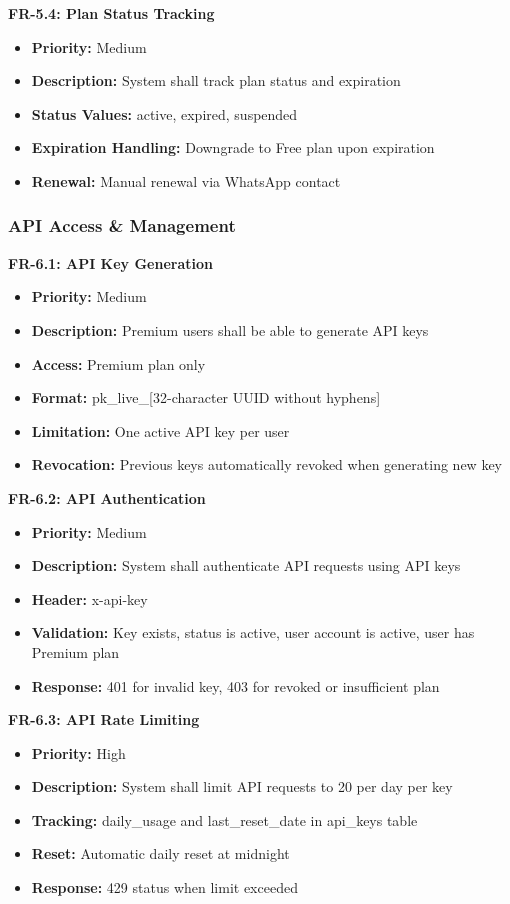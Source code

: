 \documentclass[12pt,a4paper]{article}
\begin{document}
\textbf{FR-5.4: Plan Status Tracking}
\begin{itemize}
    \item \textbf{Priority:} Medium
    \item \textbf{Description:} System shall track plan status and expiration
    \item \textbf{Status Values:} active, expired, suspended
    \item \textbf{Expiration Handling:} Downgrade to Free plan upon expiration
    \item \textbf{Renewal:} Manual renewal via WhatsApp contact
\end{itemize}

\subsubsection{API Access \& Management}

\textbf{FR-6.1: API Key Generation}
\begin{itemize}
    \item \textbf{Priority:} Medium
    \item \textbf{Description:} Premium users shall be able to generate API keys
    \item \textbf{Access:} Premium plan only
    \item \textbf{Format:} pk\_live\_[32-character UUID without hyphens]
    \item \textbf{Limitation:} One active API key per user
    \item \textbf{Revocation:} Previous keys automatically revoked when generating new key
\end{itemize}

\textbf{FR-6.2: API Authentication}
\begin{itemize}
    \item \textbf{Priority:} Medium
    \item \textbf{Description:} System shall authenticate API requests using API keys
    \item \textbf{Header:} x-api-key
    \item \textbf{Validation:} Key exists, status is active, user account is active, user has Premium plan
    \item \textbf{Response:} 401 for invalid key, 403 for revoked or insufficient plan
\end{itemize}

\textbf{FR-6.3: API Rate Limiting}
\begin{itemize}
    \item \textbf{Priority:} High
    \item \textbf{Description:} System shall limit API requests to 20 per day per key
    \item \textbf{Tracking:} daily\_usage and last\_reset\_date in api\_keys table
    \item \textbf{Reset:} Automatic daily reset at midnight
    \item \textbf{Response:} 429 status when limit exceeded
\end{itemize}
\end{document}
